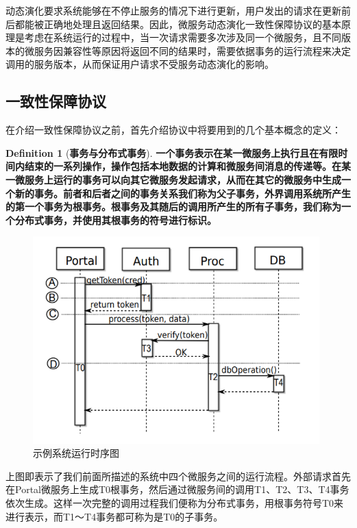 \documentclass[12pt,a4paper]{article}
\theoremstyle{definition}
\newtheorem{definition}{Definition}[section]
\begin{document}
动态演化要求系统能够在不停止服务的情况下进行更新，用户发出的请求在更新前后都能被正确地处理且返回结果。因此，微服务动态演化一致性保障协议的基本原理是考虑在系统运行的过程中，当一次请求需要多次涉及同一个微服务，且不同版本的微服务因兼容性等原因将返回不同的结果时，需要依据事务的运行流程来决定调用的服务版本，从而保证用户请求不受服务动态演化的影响。

\subsection{一致性保障协议}
在介绍一致性保障协议之前，首先介绍协议中将要用到的几个基本概念的定义：

\theoremstyle{definition}
\begin{definition}[\textbf{事务与分布式事务}]
\label{definition:transaction}
\textbf{一个事务表示在某一微服务上执行且在有限时间内结束的一系列操作，操作包括本地数据的计算和微服务间消息的传递等。在某一微服务上运行的事务可以向其它微服务发起请求，从而在其它的微服务中生成一个新的事务。前者和后者之间的事务关系我们称为父子事务，外界调用系统所产生的第一个事务为根事务。根事务及其随后的调用所产生的所有子事务，我们称为一个分布式事务，并使用其根事务的符号进行标识。}
\end{definition}

\begin{figure}[ht]
 \centering
 \includegraphics[height=8cm]{images/ExampleProcess.png}
 \caption{示例系统运行时序图}
 \label{fig:ExampleProcess}
\end{figure}


上图即表示了我们前面所描述的系统中四个微服务之间的运行流程。外部请求首先在Portal微服务上生成T0根事务，然后通过微服务间的调用T1、T2、T3、T4事务依次生成。这样一次完整的调用过程我们便称为分布式事务，用根事务符号T0来进行表示，而T1～T4事务都可称为是T0的子事务。
\end{document}
